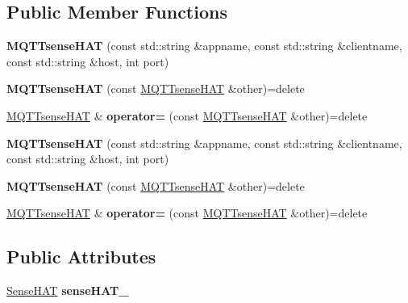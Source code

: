\subsection*{Public Member Functions}
\begin{DoxyCompactItemize}
\item 
{\bfseries M\+Q\+T\+Tsense\+H\+AT} (const std\+::string \&appname, const std\+::string \&clientname, const std\+::string \&host, int port)\hypertarget{class_m_q_t_tsense_h_a_t_aebf1fa63fff01df39062b9f8e204c094}{}\label{class_m_q_t_tsense_h_a_t_aebf1fa63fff01df39062b9f8e204c094}

\item 
{\bfseries M\+Q\+T\+Tsense\+H\+AT} (const \hyperlink{class_m_q_t_tsense_h_a_t}{M\+Q\+T\+Tsense\+H\+AT} \&other)=delete\hypertarget{class_m_q_t_tsense_h_a_t_a6dfcdbe30dac95e0348dfdfa4b79b1d1}{}\label{class_m_q_t_tsense_h_a_t_a6dfcdbe30dac95e0348dfdfa4b79b1d1}

\item 
\hyperlink{class_m_q_t_tsense_h_a_t}{M\+Q\+T\+Tsense\+H\+AT} \& {\bfseries operator=} (const \hyperlink{class_m_q_t_tsense_h_a_t}{M\+Q\+T\+Tsense\+H\+AT} \&other)=delete\hypertarget{class_m_q_t_tsense_h_a_t_a14b36ab0892f31e920b0df90194c8810}{}\label{class_m_q_t_tsense_h_a_t_a14b36ab0892f31e920b0df90194c8810}

\item 
{\bfseries M\+Q\+T\+Tsense\+H\+AT} (const std\+::string \&appname, const std\+::string \&clientname, const std\+::string \&host, int port)\hypertarget{class_m_q_t_tsense_h_a_t_aebf1fa63fff01df39062b9f8e204c094}{}\label{class_m_q_t_tsense_h_a_t_aebf1fa63fff01df39062b9f8e204c094}

\item 
{\bfseries M\+Q\+T\+Tsense\+H\+AT} (const \hyperlink{class_m_q_t_tsense_h_a_t}{M\+Q\+T\+Tsense\+H\+AT} \&other)=delete\hypertarget{class_m_q_t_tsense_h_a_t_a6dfcdbe30dac95e0348dfdfa4b79b1d1}{}\label{class_m_q_t_tsense_h_a_t_a6dfcdbe30dac95e0348dfdfa4b79b1d1}

\item 
\hyperlink{class_m_q_t_tsense_h_a_t}{M\+Q\+T\+Tsense\+H\+AT} \& {\bfseries operator=} (const \hyperlink{class_m_q_t_tsense_h_a_t}{M\+Q\+T\+Tsense\+H\+AT} \&other)=delete\hypertarget{class_m_q_t_tsense_h_a_t_a14b36ab0892f31e920b0df90194c8810}{}\label{class_m_q_t_tsense_h_a_t_a14b36ab0892f31e920b0df90194c8810}

\end{DoxyCompactItemize}
\subsection*{Public Attributes}
\begin{DoxyCompactItemize}
\item 
\hyperlink{class_sense_h_a_t}{Sense\+H\+AT} {\bfseries sense\+H\+A\+T\+\_\+}\hypertarget{class_m_q_t_tsense_h_a_t_a50dfd49dde7594da4193b8b90f6c1048}{}\label{class_m_q_t_tsense_h_a_t_a50dfd49dde7594da4193b8b90f6c1048}

\end{DoxyCompactItemize}
